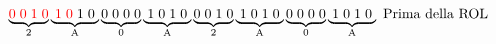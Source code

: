 \documentclass[a4paper, 12pt]{article} %
\begin{document}
\begin{enumerate}
\begin{itemize}
		$ \underbrace{\color{red}0\hspace{0.1cm}0\hspace{0.1cm}1\hspace{0.1cm}0} _{2} \underbrace{\color{red}\hspace{0.1cm}1\hspace{0.1cm}0\hspace{0.1cm}\normalcolor1\hspace{0.1cm}0\hspace{0.1cm}} _{\text{A}} \underbrace{0\hspace{0.1cm}0\hspace{0.1cm}0\hspace{0.1cm}0} _{0} \underbrace{\hspace{0.1cm}1\hspace{0.1cm}0\hspace{0.1cm}1\hspace{0.1cm}0\hspace{0.1cm}} _{\text{A}}  \underbrace{0\hspace{0.1cm}0\hspace{0.1cm}1\hspace{0.1cm}0} _{2} \underbrace{\hspace{0.1cm}1\hspace{0.1cm}0\hspace{0.1cm}1\hspace{0.1cm}0\hspace{0.1cm}} _{\text{A}} \underbrace{0\hspace{0.1cm}0\hspace{0.1cm}0\hspace{0.1cm}0} _{0} \underbrace{\hspace{0.1cm}1\hspace{0.1cm}0\hspace{0.1cm}1\hspace{0.1cm}0\hspace{0.1cm}} _{\text{A}} \text{ Prima della ROL}$ \break
		

\end{itemize}
\end{enumerate}
\end{document}
